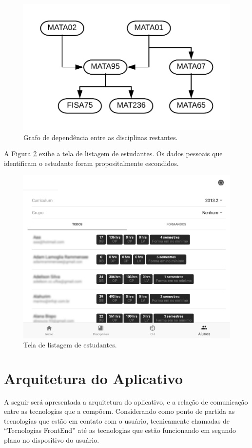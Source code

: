 \begin{figure}[H]
	   \centering
	   		\includegraphics[scale=1.3]{pics/c3/19-graph.png}
	   \caption{Grafo de dependência entre as disciplinas restantes.}
	   \label{dgraph}
\end{figure}


A Figura \ref{students} exibe a tela de listagem de estudantes. Os dados pessoais que identificam o estudante foram propositalmente escondidos.  

\begin{figure}[H]
	   \centering
	   		\includegraphics[scale=0.25]{pics/c3/18-students.png}
	   \caption{Tela de listagem de estudantes.}
	   \label{students}
\end{figure}


\section{Arquitetura do Aplicativo}
\label{frontend}
A seguir será apresentada a arquitetura do aplicativo, e a relação de comunicação entre as tecnologias que a compõem. Considerando como ponto de partida as tecnologias que estão em contato com o usuário, tecnicamente chamadas de ``Tecnologias FrontEnd'' até as tecnologias que estão funcionando em segundo plano no dispositivo do usuário.

